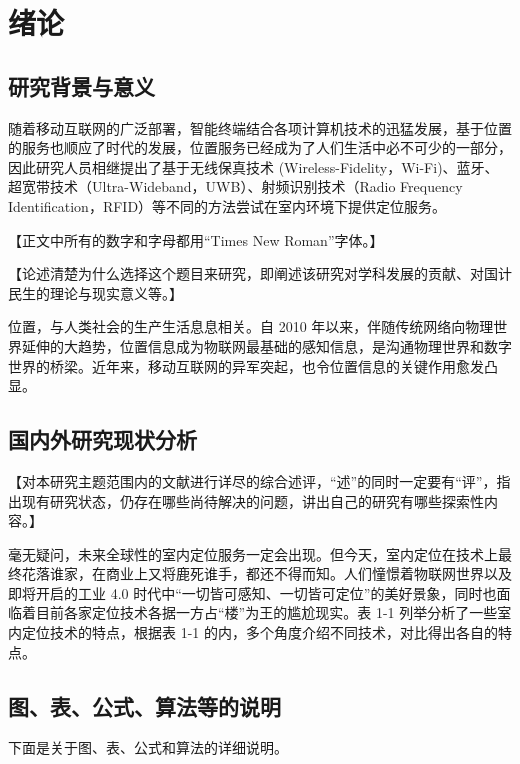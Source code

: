
\chapter{绪论}


\section{研究背景与意义}

随着移动互联网的广泛部署，智能终端结合各项计算机技术的迅猛发展，基于位置的服务也顺应了时代的发展，位置服务已经成为了人们生活中必不可少的一部分，因此研究人员相继提出了基于无线保真技术 (Wireless-Fidelity，Wi-Fi)、蓝牙、超宽带技术（Ultra-Wideband，UWB）、射频识别技术（Radio Frequency Identification，RFID）等不同的方法尝试在室内环境下提供定位服务。

\textcolor[rgb]{1.00,0.00,0.00}{【正文中所有的数字和字母都用“Times New Roman”字体。】}

\textcolor[rgb]{1.00,0.00,0.00}{【论述清楚为什么选择这个题目来研究，即阐述该研究对学科发展的贡献、对国计民生的理论与现实意义等。】}


位置，与人类社会的生产生活息息相关。自 2010 年以来，伴随传统网络向物理世界延伸的大趋势，位置信息成为物联网最基础的感知信息，是沟通物理世界和数字世界的桥梁。近年来，移动互联网的异军突起，也令位置信息的关键作用愈发凸显。

\section{国内外研究现状分析}

\textcolor[rgb]{1.00,0.00,0.00}{【对本研究主题范围内的文献进行详尽的综合述评，“述”的同时一定要有“评”，指出现有研究状态，仍存在哪些尚待解决的问题，讲出自己的研究有哪些探索性内容。】}

毫无疑问，未来全球性的室内定位服务一定会出现。但今天，室内定位在技术上最终花落谁家，在商业上又将鹿死谁手，都还不得而知。人们憧憬着物联网世界以及即将开启的工业 4.0 时代中“一切皆可感知、一切皆可定位”的美好景象，同时也面临着目前各家定位技术各据一方占“楼”为王的尴尬现实。表 1-1 列举分析了一些室内定位技术的特点，根据表 1-1 的内，多个角度介绍不同技术，对比得出各自的特点。


\section{图、表、公式、算法等的说明}

下面是关于图、表、公式和算法的详细说明。

